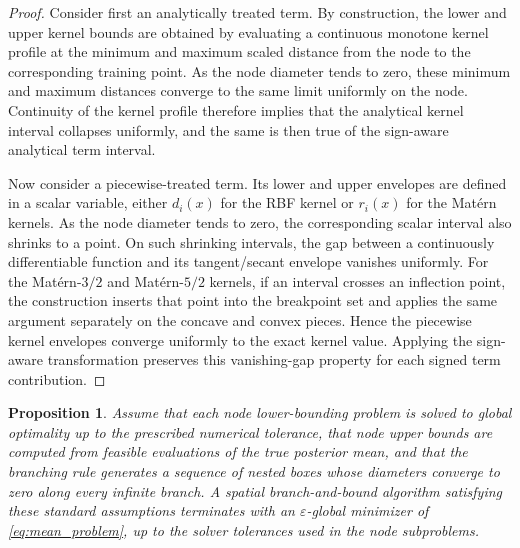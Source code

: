 \documentclass[pdflatex,sn-mathphys-num]{sn-jnl}%
\theoremstyle{thmstyleone}%
\newtheorem{proposition}[theorem]{Proposition}%
\theoremstyle{thmstyletwo}%
\theoremstyle{thmstylethree}%
\begin{document}
\begin{proof}
Consider first an analytically treated term. By construction, the lower and upper kernel bounds are obtained by evaluating a continuous monotone kernel profile at the minimum and maximum scaled distance from the node to the corresponding training point. As the node diameter tends to zero, these minimum and maximum distances converge to the same limit uniformly on the node. Continuity of the kernel profile therefore implies that the analytical kernel interval collapses uniformly, and the same is then true of the sign-aware analytical term interval.

Now consider a piecewise-treated term. Its lower and upper envelopes are defined in a scalar variable, either $d_i(x)$ for the RBF kernel or $r_i(x)$ for the Mat\'ern kernels. As the node diameter tends to zero, the corresponding scalar interval also shrinks to a point. On such shrinking intervals, the gap between a continuously differentiable function and its tangent/secant envelope vanishes uniformly. For the Mat\'ern-$3/2$ and Mat\'ern-$5/2$ kernels, if an interval crosses an inflection point, the construction inserts that point into the breakpoint set and applies the same argument separately on the concave and convex pieces. Hence the piecewise kernel envelopes converge uniformly to the exact kernel value. Applying the sign-aware transformation preserves this vanishing-gap property for each signed term contribution.
\end{proof}

\begin{proposition}
\label{thm:PALM_convergence}
Assume that each node lower-bounding problem is solved to global optimality up to the prescribed numerical tolerance, that node upper bounds are computed from feasible evaluations of the true posterior mean, and that the branching rule generates a sequence of nested boxes whose diameters converge to zero along every infinite branch. A spatial branch-and-bound algorithm satisfying these standard assumptions terminates with an $\varepsilon$-global minimizer of \eqref{eq:mean_problem}, up to the solver tolerances used in the node subproblems.
\end{proposition}
\end{document}
